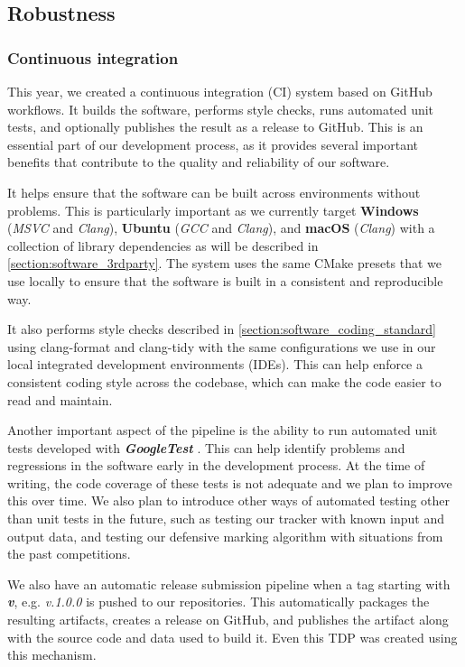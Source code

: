 \documentclass[runningheads]{llncs}
\begin{document}
\subsection{Robustness}

\subsubsection{Continuous integration}
\label{section:software_ci}
This year, we created a continuous integration (CI) system based on GitHub workflows. It builds the software, performs style checks, runs automated unit tests, and optionally publishes the result as a release to GitHub. This is an essential part of our development process, as it provides several important benefits that contribute to the quality and reliability of our software.

\indent It helps ensure that the software can be built across environments without problems. This is particularly important as we currently target \textbf{Windows} (\textit{MSVC} and \textit{Clang}), \textbf{Ubuntu} (\textit{GCC} and \textit{Clang}), and \textbf{macOS} (\textit{Clang}) with a collection of library dependencies as will be described in \ref{section:software_3rdparty}. The system uses the same CMake presets that we use locally to ensure that the software is built in a consistent and reproducible way.

\indent It also performs style checks described in \ref{section:software_coding_standard} using clang-format and clang-tidy with the same configurations we use in our local integrated development environments (IDEs). This can help enforce a consistent coding style across the codebase, which can make the code easier to read and maintain.

\indent Another important aspect of the pipeline is the ability to run automated unit tests developed with \textbf{\textit{GoogleTest}} \cite{ref_3rd-party_gtest}. This can help identify problems and regressions in the software early in the development process. At the time of writing, the code coverage of these tests is not adequate and we plan to improve this over time. We also plan to introduce other ways of automated testing other than unit tests in the future, such as testing our tracker with known input and output data, and testing our defensive marking algorithm with situations from the past competitions.

\indent We also have an automatic release submission pipeline when a tag starting with \textbf{\textit{v}}, e.g. \textit{v.1.0.0} is pushed to our repositories. This automatically packages the resulting artifacts, creates a release on GitHub, and publishes the artifact along with the source code and data used to build it. Even this TDP was created using this mechanism.
\end{document}
